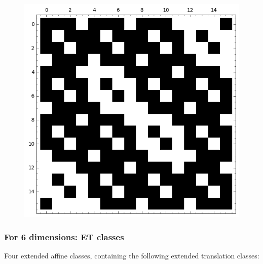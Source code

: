 \documentclass[pdf,sprung,slideColor,nocolorBG]{beamer}
\newenvironment{colortheme}[1]{
\def\ProvidesPackageRCS $##1${\relax}
\renewcommand{\ProcessOptions}{\relax}
\makeatletter

\makeatother
}{}
\begin{document}
\begin{colortheme}{jubata}
\begin{frame}
\begin{figure}
\begin{minipage}{.48\textwidth}
  \label{fig:c4_1_weight_class_matrix}
\end{minipage}%
\begin{minipage}{.48\textwidth}
  \centering
  \includegraphics[width=.9\linewidth]{../matrix_plot/re4_1_bent_cayley_graph_index_matrix.png}
  \label{fig:c4_1_bent_cayley_graph_index_matrix}
\end{minipage}
\end{figure}
\end{frame}
\begin{frame}
\frametitle{For 6 dimensions: ET classes}

Four extended affine classes, containing the following extended translation classes:


\end{frame}
\end{colortheme}
\end{document}
